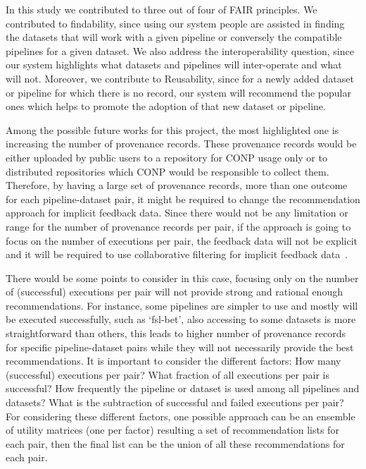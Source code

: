 In this study we contributed to three out of four of FAIR principles. We contributed to findability, since using our system people are assisted in finding the datasets that will work with a given pipeline or conversely the compatible pipelines for a given dataset. We also address the interoperability question, since our system highlights what datasets and pipelines will inter-operate and what will not. Moreover, we contribute to Reusability, since for a newly added dataset or pipeline for which there is no record, our system will recommend the popular ones which helps to promote the adoption of that new dataset or pipeline.



Among the possible future works for this project, the most highlighted one is increasing the number of provenance records. These provenance records would be either uploaded by public users to a repository for CONP usage only or to distributed repositories which CONP would be responsible to collect them. Therefore, by having a large set of provenance records, more than one outcome for each pipeline-dataset pair, it might be required to change the recommendation approach for implicit feedback data. 
Since there would not be any limitation or range for the number of provenance records per pair, if the approach is going to focus on the number of executions per pair, the feedback data will not be explicit and it will be required to use collaborative filtering for implicit feedback data~\cite{hu2008collaborative}.

There would be some points to consider in this case, focusing only on the number of (successful) executions per pair will not provide strong and rational enough recommendations. For instance, some pipelines are simpler to use and mostly will be executed successfully, such as `fsl-bet', also accessing to some datasets is more straightforward than others, this leads to higher number of provenance records for specific pipeline-dataset pairs while they will not necessarily provide the best recommendations. It is important to consider the different factors: How many (successful) executions per pair? What fraction of all executions per pair is successful? How frequently the pipeline or dataset is used among all pipelines and datasets? What is the subtraction of successful and failed executions per pair? For considering these different factors, one possible approach can be an ensemble of utility matrices (one per factor) resulting a set of recommendation lists for each pair, then the final list can be the union of all these recommendations for each pair.

